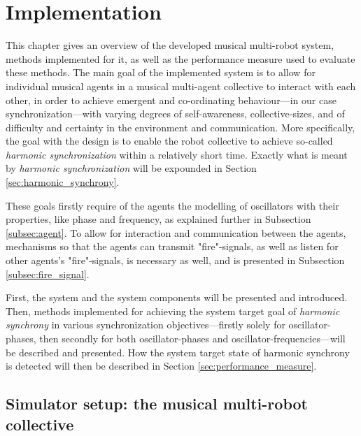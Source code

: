 \chapter{Implementation}

This chapter gives an overview of the developed musical multi-robot system, methods implemented for it, as well as the performance measure used to evaluate these methods. The main goal of the implemented system is to allow for individual musical agents in a musical multi-agent collective to interact with each other, in order to achieve emergent and co-ordinating behaviour—in our case synchronization—with varying degrees of self-awareness, collective-sizes, and of difficulty and certainty in the environment and communication. More specifically, the goal with the design is to enable the robot collective to achieve so-called \textit{harmonic synchronization} within a relatively short time. Exactly what is meant by \textit{harmonic synchronization} will be expounded in Section \ref{sec:harmonic_synchrony}.

These goals firstly require of the agents the modelling of oscillators with their properties, like phase and frequency, as explained further in Subsection \ref{subsec:agent}. To allow for interaction and communication between the agents, mechanisms so that the agents can transmit "fire"-signals, as well as listen for other agents's "fire"-signals, is necessary as well, and is presented in Subsection \ref{subsec:fire_signal}.

First, the system and the system components will be presented and introduced. Then, methods implemented for achieving the system target goal of \textit{harmonic synchrony} in various synchronization objectives—firstly solely for oscillator-phases, then secondly for both oscillator-phases and oscillator-frequencies—will be described and presented. How the system target state of harmonic synchrony is detected will then be described in Section \ref{sec:performance_measure}.




\section{Simulator setup: the musical multi-robot collective}
\label{sec:developed_system}

